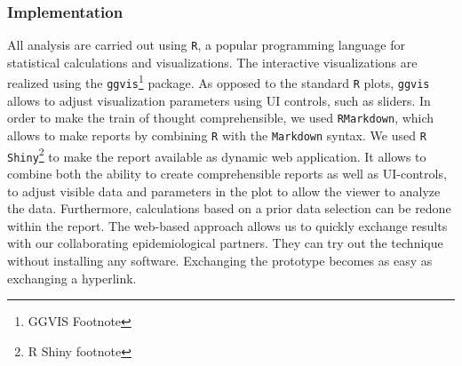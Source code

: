\documentclass[a4paper,twoside]{style/article}
\begin{document}
\subsubsection{Implementation}
All analysis are carried out using \texttt{R}, a popular programming language for statistical calculations and visualizations.
The interactive visualizations are realized using the \texttt{ggvis}\footnote{GGVIS Footnote} package.
As opposed to the standard \texttt{R} plots, \texttt{ggvis} allows to adjust visualization parameters using UI controls, such as sliders.
In order to make the train of thought comprehensible, we used \texttt{RMarkdown}, which allows to make reports by combining \texttt{R} with the \texttt{Markdown} syntax.
We used \texttt{R Shiny}\footnote{R Shiny footnote} to make the report available as dynamic web application.
It allows to combine both the ability to create comprehensible reports as well as UI-controls, to adjust visible data and parameters in the plot to allow the viewer to analyze the data.
Furthermore, calculations based on a prior data selection can be redone within the report.
The web-based approach allows us to quickly exchange results with our collaborating epidemiological partners.
They can try out the technique without installing any software.
Exchanging the prototype becomes as easy as exchanging a hyperlink.
\end{document}
